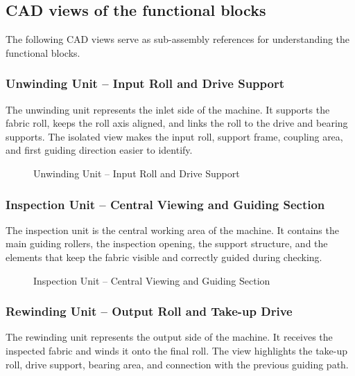 \subsection{CAD views of the functional blocks}

The following CAD views serve as sub-assembly references for understanding the functional blocks.

\subsubsection{Unwinding Unit -- Input Roll and Drive Support}

The unwinding unit represents the inlet side of the machine. It supports the fabric roll, keeps the roll axis aligned, and links the roll to the drive and bearing supports. The isolated view makes the input roll, support frame, coupling area, and first guiding direction easier to identify.

\begin{figure}[H]
\centering
{}
\caption{Unwinding Unit -- Input Roll and Drive Support}
\label{fig:chapter2-4}
\end{figure}

\subsubsection{Inspection Unit -- Central Viewing and Guiding Section}

The inspection unit is the central working area of the machine. It contains the main guiding rollers, the inspection opening, the support structure, and the elements that keep the fabric visible and correctly guided during checking.

\begin{figure}[H]
\centering
{}
\caption{Inspection Unit -- Central Viewing and Guiding Section}
\label{fig:chapter2-5}
\end{figure}

\subsubsection{Rewinding Unit -- Output Roll and Take-up Drive}

The rewinding unit represents the output side of the machine. It receives the inspected fabric and winds it onto the final roll. The view highlights the take-up roll, drive support, bearing area, and connection with the previous guiding path.

